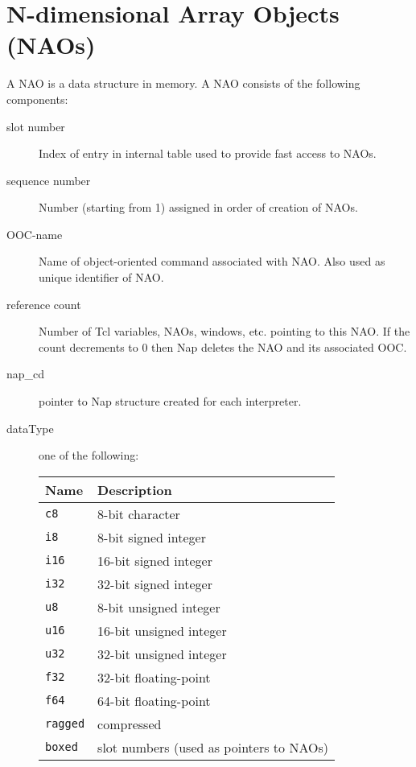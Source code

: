 
\section{N-dimensional Array Objects (NAOs)}
    \label{nao}

  A NAO is a data structure in memory. A NAO consists of the
  following components:
  \begin{description}
    \item[slot number]
    Index of entry in internal table used to provide fast access to
    NAOs.
    \item[sequence number]
    Number (starting from 1) assigned in order of creation of
    NAOs.
    \item[OOC-name]
    Name of object-oriented command associated with NAO. Also used
    as unique identifier of NAO.
    \item[reference count]
    Number of Tcl variables, NAOs, windows, etc. pointing to this
    NAO. If the count decrements to 0 then Nap deletes the NAO and its
    associated OOC.
    \item[nap\_cd]
    pointer to Nap structure created for each interpreter.
    \item[dataType]
    one of the following:

\begin{tabular}{|l|l|}
      \hline 
        \textbf{Name} & \textbf{Description}
      \\
      \hline 
          \texttt{c8} & 8-bit character
      \\
      \hline 
          \texttt{i8} & 8-bit signed integer
      \\
      \hline 
          \texttt{i16} & 16-bit signed integer
      \\
      \hline 
          \texttt{i32} & 32-bit signed integer
      \\
      \hline 
          \texttt{u8} & 8-bit unsigned integer
      \\
      \hline 
          \texttt{u16} & 16-bit unsigned integer
      \\
      \hline 
          \texttt{u32} & 32-bit unsigned integer
      \\
      \hline 
          \texttt{f32} & 32-bit floating-point
      \\
      \hline 
          \texttt{f64} & 64-bit floating-point
      \\
      \hline 
          \texttt{ragged} & compressed
      \\
      \hline 
          \texttt{boxed} & slot numbers (used as pointers to NAOs)
      \\
    \hline
\end{tabular}


\end{description}
